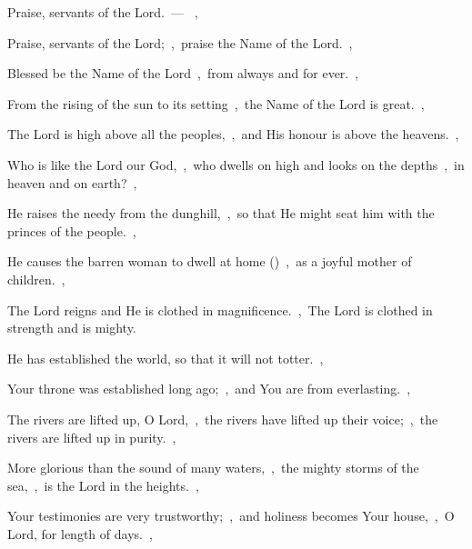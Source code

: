 \documentclass[12pt,twoside,a5paper]{article}
\begin{document}
\begin{halfparskip}
   Praise, servants of the Lord.~--- ~\sep

  Praise, servants of the Lord;~\sep\ praise the Name of the Lord.~\sep

  Blessed be the Name of the Lord~\sep\ from always and for ever.~\sep

  From the rising of the sun to its setting~\sep\ the Name of the Lord is great.~\sep

  The Lord is high above all the peoples,~\sep\ and His honour is above the heavens.~\sep

  Who is like the Lord our God,~\sep\ who dwells on high and looks on the depths~\sep\ in heaven and on earth?~\sep

  He raises the needy from the dunghill,~\sep\ so that He might seat him with the princes of the people.~\sep

  He causes the barren woman to dwell at home ()~\sep\ as a joyful mother of children.~\sep

\end{halfparskip}

\begin{halfparskip}
   The Lord reigns and He is clothed in magnificence.~\sep\ The Lord is clothed in strength and is mighty.

  He has established the world, so that it will not totter.~\sep

  Your throne was established long ago;~\sep\ and You are from everlasting.~\sep

  The rivers are lifted up, O Lord,~\sep\ the rivers have lifted up their voice;~\sep\ the rivers are lifted up in purity.~\sep

  More glorious than the sound of many waters,~\sep\ the mighty storms of the sea,~\sep\ is the Lord in the heights.~\sep

  Your testimonies are very trustworthy;~\sep\ and holiness becomes Your house,~\sep\ O Lord, for length of days.~\sep
\end{halfparskip}
\end{document}
